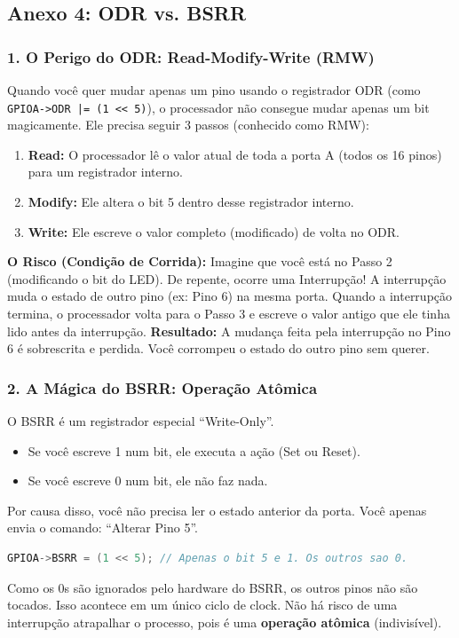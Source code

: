 \documentclass[12pt,a4paper]{article}
\begin{document}
\newpage
\subsection*{Anexo 4: ODR vs. BSRR}
\label{anexo:4}

\subsubsection*{1. O Perigo do ODR: Read-Modify-Write (RMW)}
Quando você quer mudar apenas um pino usando o registrador ODR (como \texttt{GPIOA->ODR |= (1 << 5)}), o processador não consegue mudar apenas um bit magicamente. Ele precisa seguir 3 passos (conhecido como RMW):
\begin{enumerate}
    \item \textbf{Read:} O processador lê o valor atual de toda a porta A (todos os 16 pinos) para um registrador interno.
    \item \textbf{Modify:} Ele altera o bit 5 dentro desse registrador interno.
    \item \textbf{Write:} Ele escreve o valor completo (modificado) de volta no ODR.
\end{enumerate}

\textbf{O Risco (Condição de Corrida):}
Imagine que você está no Passo 2 (modificando o bit do LED). De repente, ocorre uma Interrupção! A interrupção muda o estado de outro pino (ex: Pino 6) na mesma porta. Quando a interrupção termina, o processador volta para o Passo 3 e escreve o valor antigo que ele tinha lido antes da interrupção. \textbf{Resultado:} A mudança feita pela interrupção no Pino 6 é sobrescrita e perdida. Você corrompeu o estado do outro pino sem querer.

\subsubsection*{2. A Mágica do BSRR: Operação Atômica}
O BSRR é um registrador especial ``Write-Only''.
\begin{itemize}
    \item Se você escreve 1 num bit, ele executa a ação (Set ou Reset).
    \item Se você escreve 0 num bit, ele não faz nada.
\end{itemize}
Por causa disso, você não precisa ler o estado anterior da porta. Você apenas envia o comando: ``Alterar Pino 5''.
\begin{lstlisting}[language=C]
GPIOA->BSRR = (1 << 5); // Apenas o bit 5 e 1. Os outros sao 0.
\end{lstlisting}
Como os 0s são ignorados pelo hardware do BSRR, os outros pinos não são tocados. Isso acontece em um único ciclo de clock. Não há risco de uma interrupção atrapalhar o processo, pois é uma \textbf{operação atômica} (indivisível).
\end{document}
